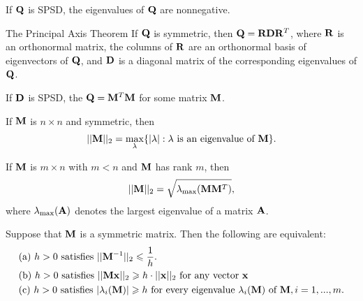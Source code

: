\begin{proposition}{}{}
    If $\bold{Q}$ is SPSD, the eigenvalues of $\bold{Q}$ are nonnegative.
\end{proposition}

\begin{theorem}{The Principal Axis Theorem}{}
    If $\bold{Q}$ is symmetric, then $\bold{Q}=\bold{R}\bold{D}\bold{R}^T$,
    where $\bold{R}$ is an orthonormal matrix, the columns of $\bold{R}$ are an orthonormal basis of eigenvectors of $\bold{Q}$,
    and $\bold{D}$ is a diagonal matrix of the corresponding eigenvalues of $\bold{Q}$.
\end{theorem}

\begin{proposition}{}{}
    If $\bold{D}$ is SPSD, the $\bold{Q}=\bold{M}^T\bold{M}$ for some matrix $\bold{M}$.
\end{proposition}


\begin{proposition}{}{}
    If $\bold{M}$ is $n\times n$ and symmetric, then
    \begin{align*}
        ||\bold{M}||_2=\max_{\lambda} \{|\lambda|:\lambda \text{ is an eigenvalue of } \bold{M}\}.
    \end{align*}
\end{proposition}

\begin{proposition}{}{}
    If $\bold{M}$ is $m\times n$ with $m<n$ and $\bold{M}$ has rank $m$, then 
    \begin{align*}
        ||\bold{M}||_2=\sqrt{\lambda_{\max}(\bold{M}\bold{M}^T)},
    \end{align*}
    where $\lambda_{\max}(\bold{A})$ denotes the largest eigenvalue of a matrix $\bold{A}$.
\end{proposition}

\begin{proposition}{}{}
    Suppose that $\bold{M}$ is a symmetric matrix. Then the following are equivalent:
    \begin{align*}
        &\text{(a) } h>0 \text{ satisfies } ||\bold{M}^{-1}||_2\leqslant \frac{1}{h}.\\
        &\text{(b) } h>0 \text{ satisfies } ||\bold{M}\bold{x}||_2 \geqslant h\cdot ||\bold{x}||_2 \text{ for any vector } \bold{x}\\
        &\text{(c) } h>0 \text{ satisfies } |\lambda_i(\bold{M})|\geqslant h \text{ for every eigenvalue } \lambda_i(\bold{M}) \text{ of } \bold{M}, i=1,...,m.
    \end{align*}
\end{proposition}



